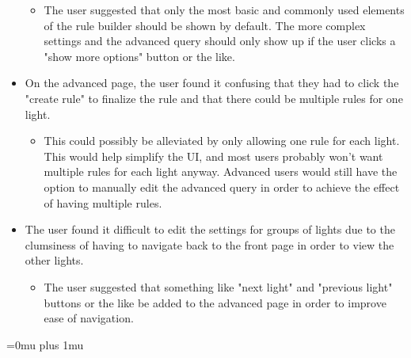 \documentclass[oneside,openright]{book}
\begin{document}
\begin{itemize}
\begin{itemize}
            \item The user suggested that only the most basic and commonly used
                elements of the rule builder should be shown by default.  The
                more complex settings and the advanced query should only show
                up if the user clicks a "show more options" button or the like.
        \end{itemize}
    \item On the advanced page, the user found it confusing that they had to
        click the "create rule" to finalize the rule and that there could be
        multiple rules for one light.
        \begin{itemize}
            \item This could possibly be alleviated by only allowing one rule
                for each light.  This would help simplify the UI, and most
                users probably won't want multiple rules for each light anyway.
                Advanced users would still have the option to manually edit the
                advanced query in order to achieve the effect of having
                multiple rules.
        \end{itemize}
    \item The user found it difficult to edit the settings for groups of lights
        due to the clumsiness of having to navigate back to the front page in
        order to view the other lights.
        \begin{itemize}
            \item The user suggested that something like "next light" and
                "previous light" buttons or the like be added to the advanced
                page in order to improve ease of navigation.
        \end{itemize}
\end{itemize}

\newpage
\Urlmuskip=0mu plus 1mu\relax
{}

\end{document}

